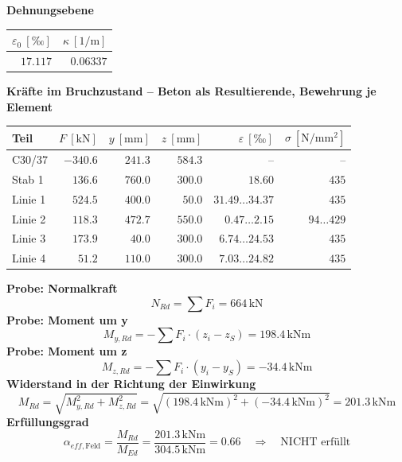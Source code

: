 \documentclass[11pt,a4paper]{article}
\begin{document}
\noindent\textbf{Dehnungsebene}
\begin{longtable}{rr}
\hline
$\varepsilon_0\ [\text{‰}]$ & $\kappa\ [\mathrm{1/m}]$ \\
\hline
\endhead
$17.117$ & $0.06337$ \\
\hline
\end{longtable}
\noindent\textbf{Kräfte im Bruchzustand -- Beton als Resultierende, Bewehrung je Element}
\begin{longtable}{lrrrrr}
\hline
Teil & $F\ [\mathrm{kN}]$ & $y\ [\mathrm{mm}]$ & $z\ [\mathrm{mm}]$ & $\varepsilon\ [\text{‰}]$ & $\sigma\ [\mathrm{N/mm^2}]$ \\
\hline
\endhead
C30/37 & $-340.6$ & $241.3$ & $584.3$ & – & – \\
Stab 1 & $136.6$ & $760.0$ & $300.0$ & $18.60$ & $435$ \\
Linie 1 & $524.5$ & $400.0$ & $50.0$ & $31.49 \ldots 34.37$ & $435$ \\
Linie 2 & $118.3$ & $472.7$ & $550.0$ & $0.47 \ldots 2.15$ & $94 \ldots 429$ \\
Linie 3 & $173.9$ & $40.0$ & $300.0$ & $6.74 \ldots 24.53$ & $435$ \\
Linie 4 & $51.2$ & $110.0$ & $300.0$ & $7.03 \ldots 24.82$ & $435$ \\
\hline
\end{longtable}
\noindent\textbf{Probe: Normalkraft}
\begin{equation*}
N_{Rd} = \sum F_i = 664\,\mathrm{kN}
\end{equation*}
\noindent\textbf{Probe: Moment um y}
\begin{equation*}
M_{y,Rd} = -\sum F_i \cdot (z_i - z_S) = 198.4\,\mathrm{kNm}
\end{equation*}
\noindent\textbf{Probe: Moment um z}
\begin{equation*}
M_{z,Rd} = -\sum F_i \cdot (y_i - y_S) = -34.4\,\mathrm{kNm}
\end{equation*}
\noindent\textbf{Widerstand in der Richtung der Einwirkung}
\begin{equation*}
M_{Rd} = \sqrt{M_{y,Rd}^{2} + M_{z,Rd}^{2}} = \sqrt{\left(198.4\,\mathrm{kNm}\right)^{2} + \left(-34.4\,\mathrm{kNm}\right)^{2}} = 201.3\,\mathrm{kNm}
\end{equation*}
\noindent\textbf{Erfüllungsgrad}
\begin{equation*}
\alpha_{eff,\text{Feld}} = \frac{M_{Rd}}{M_{Ed}} = \frac{201.3\,\mathrm{kNm}}{304.5\,\mathrm{kNm}} = 0.66 \quad \Rightarrow \quad \text{NICHT erfüllt}
\end{equation*}
\end{document}
